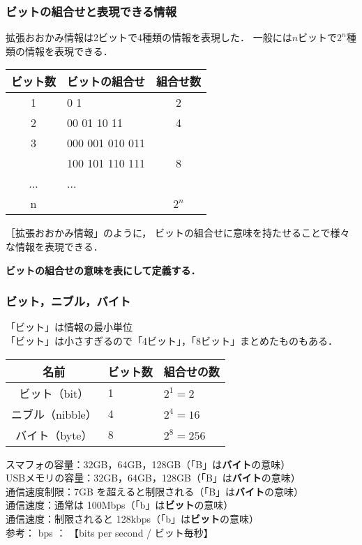 \documentclass{beamer}                 %
\begin{document}
\begin{frame}
  \frametitle{ビットの組合せと表現できる情報}
  拡張おおかみ情報は2ビットで4種類の情報を表現した．
  一般には$n$ビットで$2^n$種類の情報を表現できる．
  \begin{center}
    {\small\begin{tabular}{c|l|c} \hline\hline
      ビット数 & \multicolumn{1}{c|}{ビットの組合せ} & 組合せ数\\
      \hline
      1 & 0 1   & 2 \\
      2 & 00 01 10 11 & 4 \\
      3 & 000 001 010 011 &   \\
      & 100 101 110 111 & 8 \\
      ...& ... &\\
      n &  & $2^n$ \\
    \end{tabular}}
  \end{center}

  ［拡張おおかみ情報」のように，
  ビットの組合せに意味を持たせることで様々な情報を表現できる．
  \begin{center}
    {\bf ビットの組合せの意味を表にして定義する．}
  \end{center}
\end{frame}

\begin{frame}
  \frametitle{ビット，ニブル，バイト}
  「ビット」は情報の最小単位 \\
  「ビット」は小さすぎるので「4ビット」，「8ビット」まとめたものもある．

  \begin{center}
    \begin{tabular}{c|l|l} \hline\hline
      名前 & ビット数 & 組合せの数\\
      \hline
      ビット（bit）    & 1   & $2^1 = 2$ \\
      ニブル（nibble） & 4   & $2^4 = 16$ \\
      バイト（byte） & 8   & $2^8 = 256$ \\
    \end{tabular}
  \end{center}

  スマフォの容量：32GB，64GB，128GB（「B」は{\bf バイト}の意味） \\
  USBメモリの容量：32GB，64GB，128GB（「B」は{\bf バイト}の意味） \\
  通信速度制限：7GB を超えると制限される（「B」は{\bf バイト}の意味） \\
  通信速度：通常は 100Mbps（「b」は{\bf ビット}の意味） \\
  通信速度：制限されると 128kbps（「b」は{\bf ビット}の意味） \\

  参考： bps ： 【bits per second / ビット毎秒】
\end{frame}
\end{document}
